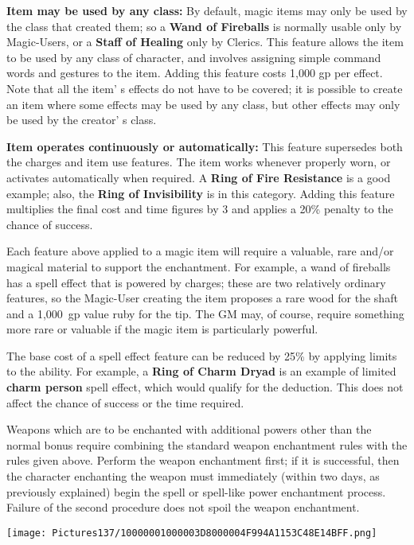 \documentclass[a4paper,twoside,openany,10pt]{book}
\begin{document}
\begin{multicols}{2}
\textbf{Item may be used by any class:} By default, magic items may only be used by the class that created them; so a \textbf{Wand of Fireballs} is normally usable only by Magic-Users, or a \textbf{Staff of Healing} only by Clerics. This feature allows the item to be used by any class of character, and involves assigning simple command words and gestures to the item. Adding this feature costs 1,000 gp per effect. Note that all the item' s effects do not have to be covered; it is possible to create an item where some effects may be used by any class, but other effects may only be used by the creator' s class.


\textbf{Item operates continuously or automatically:} This feature supersedes both the charges and item use features. The item works whenever properly worn, or activates automatically when required. A \textbf{Ring of Fire Resistance} is a good example; also, the \textbf{Ring of Invisibility} is in this category. Adding this feature multiplies the final cost and time figures by 3 and applies a 20\% penalty to the chance of success. 

Each feature above applied to a magic item will require a valuable, rare and/or magical material to support the enchantment. For example, a wand of fireballs has a spell effect that is powered by charges; these are two relatively ordinary features, so the Magic-User creating the item proposes a rare wood for the shaft and a 1,000~gp value ruby for the tip. The GM may, of course, require something more rare or valuable if the magic item is particularly powerful.

The base cost of a spell effect feature can be reduced by 25\% by applying limits to the ability. For example, a \textbf{Ring of Charm Dryad} is an example of limited \textbf{charm person} spell effect, which would qualify for the deduction. This does not affect the chance of success or the time required.

Weapons which are to be enchanted with additional powers other than the normal bonus require combining the standard weapon enchantment rules with the rules given above. Perform the weapon enchantment first; if it is successful, then the character enchanting the weapon must immediately (within two days, as previously explained) begin the spell or spell-like power enchantment process. Failure of the second procedure does not spoil the weapon enchantment.


\begin{center}
	\texttt{[image: Pictures137/10000001000003D8000004F994A1153C48E14BFF.png]}
\end{center}


\end{multicols}
\end{document}
